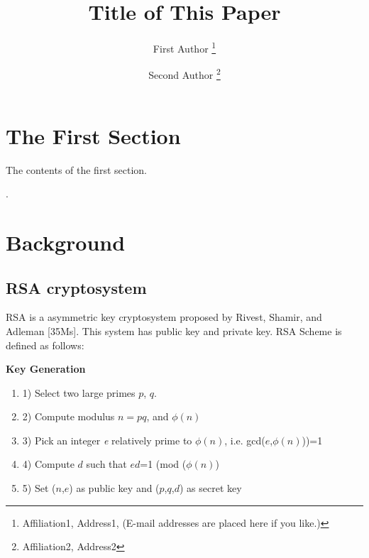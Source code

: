 \documentclass[a4paper]{article}
\begin{document}
\title{
  Title of This Paper     %
}
\author{
  First Author           %
  \thanks{
    Affiliation1, Address1,   %
    (E-mail addresses are placed here if you like.)
  }
  \and
  Second Author          %
  \thanks{ %
    Affiliation2, Address2  %
  }
}

\maketitle

\section{The First Section}

The contents of the first section.

\newpage
.
\newpage
\section{Background}

\subsection {RSA cryptosystem}
RSA is a asymmetric key cryptosystem proposed by Rivest, Shamir, and Adleman [35Ms]. This system has public key and private key. RSA Scheme is defined as follows:

\textbf{Key Generation}
\begin{enumerate}[label=]
      \item 1) Select two large primes $p$, $q$.
      
      \item 2) Compute modulus $n=pq$, and $\phi(n)$ 
      
      \item 3) Pick an integer \textit{e} relatively prime to $\phi(n)$, i.e. gcd($e$,$\phi(n)$))=1
      
      \item 4) Compute $d$ such that $ed$=1 (mod ($\phi(n)$)
      
      \item 5) Set ($n$,$e$) as public key  and ($p$,$q$,$d$) as secret key  
\end{enumerate}
\end{document}
